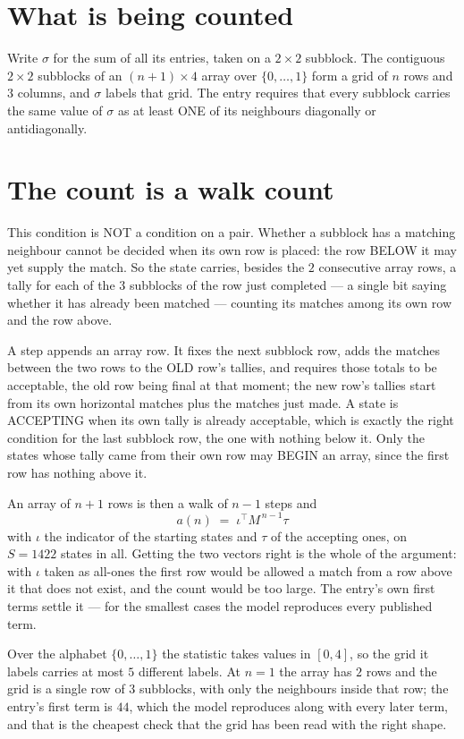 \documentclass[11pt,a4paper]{article}
\theoremstyle{plain}
\theoremstyle{definition}
\begin{document}
\section{What is being counted}

Write $\sigma$ for the sum of all its entries, taken on a $2\times2$ subblock. The contiguous $2\times2$
subblocks of an $(n+1)\times4$ array over $\{0,\dots,1\}$ form a grid of $n$ rows
and $3$ columns, and $\sigma$ labels that grid. The entry
requires that every subblock carries the same value of $\sigma$ as at least ONE of its neighbours diagonally or antidiagonally.

\section{The count is a walk count}

This condition is NOT a condition on a pair. Whether a subblock has a
matching neighbour cannot be decided when its own row is placed: the row BELOW it may yet
supply the match. So the state carries, besides the $2$ consecutive array rows, a tally for
each of the $3$ subblocks of the row just completed --- a single bit saying whether it has already been matched --- counting its matches
among its own row and the row above.

A step appends an array row. It fixes the next subblock row, adds the matches between the two
rows to the OLD row's tallies, and requires those totals to be acceptable, the old row being
final at that moment; the new row's tallies start from its own horizontal matches plus the
matches just made. A state is ACCEPTING when its own tally is already acceptable, which is
exactly the right condition for the last subblock row, the one with nothing below it. Only the
states whose tally came from their own row may BEGIN an array, since the first row has nothing
above it.

An array of $n+1$ rows is then a walk of $n-1$ steps and
\[
a(n)\;=\;\iota^{\!\top}M^{\,n-1}\tau
\]
with $\iota$ the indicator of the starting states and $\tau$ of the accepting ones, on
$S=1422$ states in all. Getting the two vectors right is the whole of the argument: with
$\iota$ taken as all-ones the first row would be allowed a match from a row above it that does
not exist, and the count would be too large. The entry's own first terms settle it --- for
the smallest cases
the model reproduces every published term.

Over the alphabet $\{0,\dots,1\}$ the statistic takes values in $[0,4]$, so the
grid it labels carries at most $5$ different labels. At $n=1$ the array has $2$
rows and the grid is a single row of $3$
subblocks, with only the neighbours inside that row; the entry's first term is
$44$, which the model reproduces along with every later term, and that is the cheapest
check that the grid has been read with the right shape.
\end{document}
